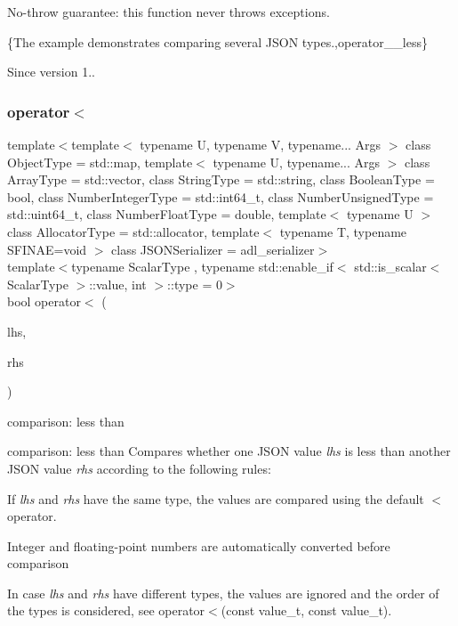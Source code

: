 No-\/throw guarantee\+: this function never throws exceptions.

\{The example demonstrates comparing several J\+S\+ON types.,operator\+\_\+\+\_\+less\}

\begin{DoxySince}{Since}
version 1.. 
\end{DoxySince}
\mbox{\label{classnlohmann_1_1basic__json_abed3e9b4ab75f5bcbd3cd20f5af5cdab}} 
\subsubsection{\texorpdfstring{operator$<$}{operator<}\hspace{0.1cm}{\footnotesize\ttfamily [3/3]}}
{\footnotesize\ttfamily template$<$template$<$ typename U, typename V, typename... Args $>$ class Object\+Type = std\+::map, template$<$ typename U, typename... Args $>$ class Array\+Type = std\+::vector, class String\+Type  = std\+::string, class Boolean\+Type  = bool, class Number\+Integer\+Type  = std\+::int64\+\_\+t, class Number\+Unsigned\+Type  = std\+::uint64\+\_\+t, class Number\+Float\+Type  = double, template$<$ typename U $>$ class Allocator\+Type = std\+::allocator, template$<$ typename T, typename S\+F\+I\+N\+A\+E=void $>$ class J\+S\+O\+N\+Serializer = adl\+\_\+serializer$>$ \\
template$<$typename Scalar\+Type , typename std\+::enable\+\_\+if$<$ std\+::is\+\_\+scalar$<$ Scalar\+Type $>$\+::value, int $>$\+::type  = 0$>$ \\
bool operator$<$ (\begin{DoxyParamCaption}\item[{const Scalar\+Type}]{lhs,  }\item[{\mbox{\hyperlink{classnlohmann_1_1basic__json_a4057c5425f4faacfe39a8046871786ca}{const\+\_\+reference}}}]{rhs }\end{DoxyParamCaption})\hspace{0.3cm}{\ttfamily [friend]}}



comparison\+: less than 

comparison\+: less than Compares whether one J\+S\+ON value {\itshape lhs} is less than another J\+S\+ON value {\itshape rhs} according to the following rules\+:
\begin{DoxyItemize}
\item If {\itshape lhs} and {\itshape rhs} have the same type, the values are compared using the default {\ttfamily $<$} operator.
\item Integer and floating-\/point numbers are automatically converted before comparison
\item In case {\itshape lhs} and {\itshape rhs} have different types, the values are ignored and the order of the types is considered, see operator$<$(const value\+\_\+t, const value\+\_\+t).
\end{DoxyItemize}


